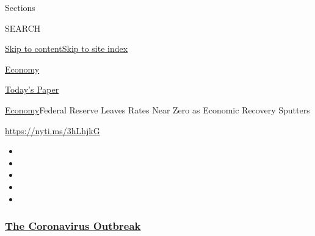 Sections

SEARCH

\protect\hyperlink{site-content}{Skip to
content}\protect\hyperlink{site-index}{Skip to site index}

\href{https://www.nytimes3xbfgragh.onion/section/business/economy}{Economy}

\href{https://myaccount.nytimes3xbfgragh.onion/auth/login?response_type=cookie\&client_id=vi}{}

\href{https://www.nytimes3xbfgragh.onion/section/todayspaper}{Today's
Paper}

\href{/section/business/economy}{Economy}\textbar{}Federal Reserve
Leaves Rates Near Zero as Economic Recovery Sputters

\url{https://nyti.ms/3hLhjkG}

\begin{itemize}
\item
\item
\item
\item
\item
\end{itemize}

\hypertarget{the-coronavirus-outbreak}{%
\subsubsection{\texorpdfstring{\href{https://www.nytimes3xbfgragh.onion/news-event/coronavirus?name=styln-coronavirus-markets\&region=TOP_BANNER\&variant=undefined\&block=storyline_menu_recirc\&action=click\&pgtype=Article\&impression_id=623e47b0-e3a1-11ea-912a-61b8543016b1}{The
Coronavirus
Outbreak}}{The Coronavirus Outbreak}}\label{the-coronavirus-outbreak}}

